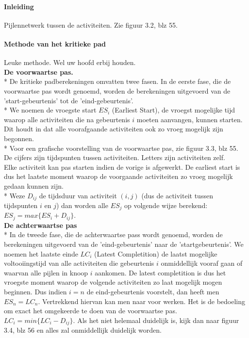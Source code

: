\documentclass[12pt]{article}
\begin{document}
\paragraph{Inleiding}
Pijlennetwerk tussen de activiteiten. Zie figuur 3.2, blz 55.
\paragraph{Methode van het kritieke pad}
Leuke methode. Wel uw hoofd erbij houden.\\
\textbf{De voorwaartse pas.}\\*
De kritieke padberekeningen omvatten twee fasen. In de eerste fase, die de voorwaartse pas wordt genoemd, worden de berekeningen uitgevoerd van de 'start-gebeurtenis' tot de 'eind-gebeurtenis'.\\*
We noemen de vroegste start $ES_i$ (Earliest Start), de vroegst mogelijke tijd waarop alle activiteiten die na gebeurtenis $i$ moeten aanvangen, kunnen starten. Dit houdt in dat alle voorafgaande activiteiten ook zo vroeg mogelijk zijn begonnen.\\*
Voor een grafische voorstelling van de voorwaartse pas, zie figuur 3.3, blz 55. De cijfers zijn tijdspunten tussen activiteiten. Letters zijn activiteiten zelf.\\
Elke activiteit kan pas starten indien de vorige is afgewerkt. De earliest start is dus het laatste moment waarop de voorgaande activiteiten zo vroeg mogelijk gedaan kunnen zijn.\\*
Weze $D_{ij}$ de tijdsduur van activiteit $(i,j)$ (dus de activiteit tussen tijdspunten $i$ en $j$) dan worden alle $ES_j$ op volgende wijze berekend: $ES_j = max\{ES_i+D_{ij}\}$.\\
\textbf{De achterwaartse pas}\\*
In de tweede fase, die de achterwaartse pass wordt genoemd, worden de berekeningen uitgevoerd van de 'eind-gebeurtenis' naar de 'startgebeurtenis'. We noemen het laatste einde $LC_i$ (Latest Completition) de laatst mogelijke voltooiingstijd van alle activiteiten die gebeurtenis $i$ onmiddellijk vooraf gaan of waarvan alle pijlen in knoop $i$ aankomen. De latest completition is dus het vroegste moment waarop de volgende activiteiten zo laat mogelijk mogen beginnen. Dus indien $i = n$ de eind-gebeurtenis voorstelt, dan heeft men $ES_n = LC_n$. Vertrekkend hiervan kan men naar voor werken. Het is de bedoeling om exact het omgekeerde te doen van de voorwaartse pas. $LC_i = min\{LC_i-D_{ij}\}$. Als het niet helemaal duidelijk is, kijk dan naar figuur 3.4, blz 56 en alles zal onmiddellijk duidelijk worden.\\
\end{document}
